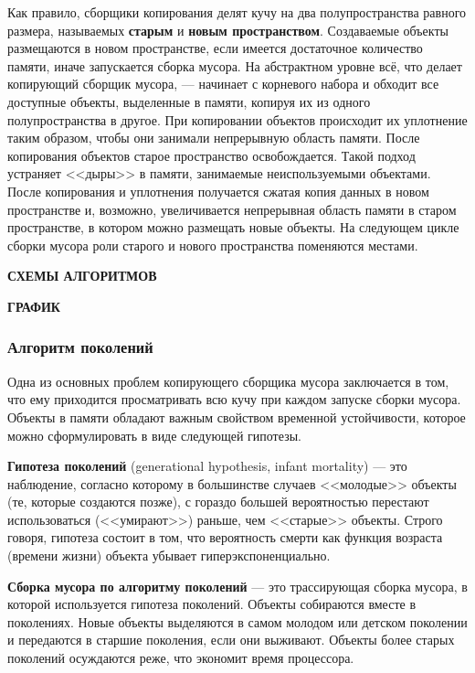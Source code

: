 Как правило, сборщики копирования делят кучу на два полупространства равного размера, называемых \textbf{старым} и \textbf{новым пространством}. Создаваемые объекты размещаются в новом пространстве, если имеется достаточное количество памяти, иначе запускается сборка мусора. На абстрактном уровне всё, что делает копирующий сборщик мусора, --- начинает с корневого набора и обходит все доступные объекты, выделенные в памяти, копируя их из одного полупространства в другое. При копировании объектов происходит их уплотнение таким образом, чтобы они занимали непрерывную область памяти. После копирования объектов старое пространство освобождается. Такой подход устраняет <<дыры>> в памяти, занимаемые неиспользуемыми объектами. После копирования и уплотнения получается сжатая копия данных в новом пространстве и, возможно, увеличивается непрерывная область памяти в старом пространстве, в котором можно размещать новые объекты. На следующем цикле сборки мусора роли старого и нового пространства поменяются местами. \cite{handbook} \cite{cornell3}



\textbf{СХЕМЫ АЛГОРИТМОВ}

\textbf{ГРАФИК}



\subsubsection{Алгоритм поколений}

Одна из основных проблем копирующего сборщика мусора заключается в том, что ему приходится просматривать всю кучу при каждом запуске сборки мусора. Объекты в памяти обладают важным свойством временной устойчивости, которое можно сформулировать в виде следующей гипотезы. \cite{cornell3}

\textbf{Гипотеза поколений} (generational hypothesis, infant mortality) \cite{glossary} --- это наблюдение, согласно которому в большинстве случаев <<молодые>> объекты (те, которые создаются позже), с гораздо большей вероятностью перестают использоваться (<<умирают>>) раньше, чем <<старые>> объекты. Строго говоря, гипотеза состоит в том, что вероятность смерти как функция возраста (времени жизни) объекта убывает гиперэкспоненциально.

\textbf{Сборка мусора по алгоритму поколений} \cite{glossary} --- это трассирующая сборка мусора, в которой используется гипотеза поколений. Объекты собираются вместе в поколениях. Новые объекты выделяются в самом молодом или детском поколении и передаются в старшие поколения, если они выживают. Объекты более старых поколений осуждаются реже, что экономит время процессора.

